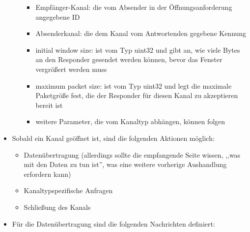 \documentclass[a4paper]{article}
\begin{document}
\begin{multicols}{3}
\begin{itemize}
\begin{itemize}
                        \begin{itemize}
                            \item
                                  Empfänger-Kanal: die vom Absender in der Öffnungsanforderung
                                  angegebene ID
                            \item
                                  Absenderkanal: die dem Kanal vom Antwortenden gegebene Kennung
                            \item
                                  initial window size: ist vom Typ uint32 und gibt an, wie viele
                                  Bytes an den Responder gesendet werden können, bevor das Fenster
                                  vergrößert werden muss
                            \item
                                  maximum packet size: ist vom Typ uint32 und legt die maximale
                                  Paketgröße fest, die der Responder für diesen Kanal zu akzeptieren
                                  bereit ist
                            \item
                                  weitere Parameter, die vom Kanaltyp abhängen, können folgen
                        \end{itemize}
              \end{itemize}
        \item
              Sobald ein Kanal geöffnet ist, sind die folgenden Aktionen möglich:

              \begin{itemize}
                  \item
                        Datenübertragung (allerdings sollte die empfangende Seite wissen,
                        ,,was mit den Daten zu tun ist'', was eine weitere vorherige
                        Aushandlung erfordern kann)
                  \item
                        Kanaltypspezifische Anfragen
                  \item
                        Schließung des Kanals
              \end{itemize}
        \item
              Für die Datenübertragung sind die folgenden Nachrichten definiert:


\end{itemize}
\end{multicols}
\end{document}
